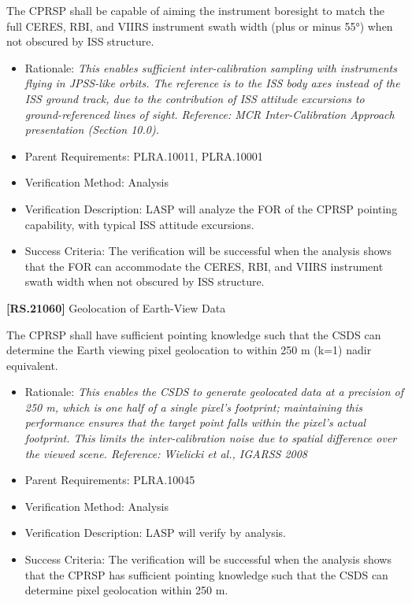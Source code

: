 \documentclass[12pt,oneside,oldfontcommands]{memoir}
\begin{document}
The \gls{CPRSP} shall be capable of aiming the instrument boresight to match the full \gls{CERES}, \gls{RBI}, and \gls{VIIRS} instrument swath width (plus or minus 55°) when not obscured by \gls{ISS} structure.

\begin{itemize}
\item{} Rationale: \emph{This enables sufficient inter-calibration sampling with instruments flying in JPSS-like orbits. The reference is to the ISS body axes instead of the ISS ground track, due to the contribution of ISS attitude excursions to ground-referenced lines of sight. Reference: MCR Inter-Calibration Approach presentation (Section 10.0).}

\item{} Parent Requirements: PLRA.10011, PLRA.10001

\item{} Verification Method: Analysis

\item{} Verification Description: \gls{LASP} will analyze the FOR of the \gls{CPRSP} \gls{point}ing capability, with typical \gls{ISS} attitude excursions.

\item{} Success Criteria: The verification will be successful when the \gls{analysis} shows that the FOR can accommodate the \gls{CERES}, \gls{RBI}, and \gls{VIIRS} instrument swath width when not obscured by \gls{ISS} structure.

\end{itemize}

\textbf{[RS.21060]} Geolocation of Earth-View Data

The \gls{CPRSP} shall have sufficient \gls{point}ing knowledge such that the \gls{CSDS} can determine the Earth viewing pixel geolocation to within 250 m (k=1) nadir equivalent.

\begin{itemize}
\item{} Rationale: \emph{This enables the CSDS to generate geolocated data at a precision of 250 m, which is one half of a single pixel's footprint; maintaining this performance ensures that the target point falls within the pixel's actual footprint. This limits the inter-calibration noise due to spatial difference over the viewed scene. Reference: Wielicki et al., IGARSS 2008}

\item{} Parent Requirements: PLRA.10045

\item{} Verification Method: Analysis

\item{} Verification Description: \gls{LASP} will verify by \gls{analysis}.

\item{} Success Criteria: The verification will be successful when the \gls{analysis} shows that the \gls{CPRSP} has sufficient \gls{point}ing knowledge such that the \gls{CSDS} can determine pixel geolocation within 250 m.

\end{itemize}
\end{document}
